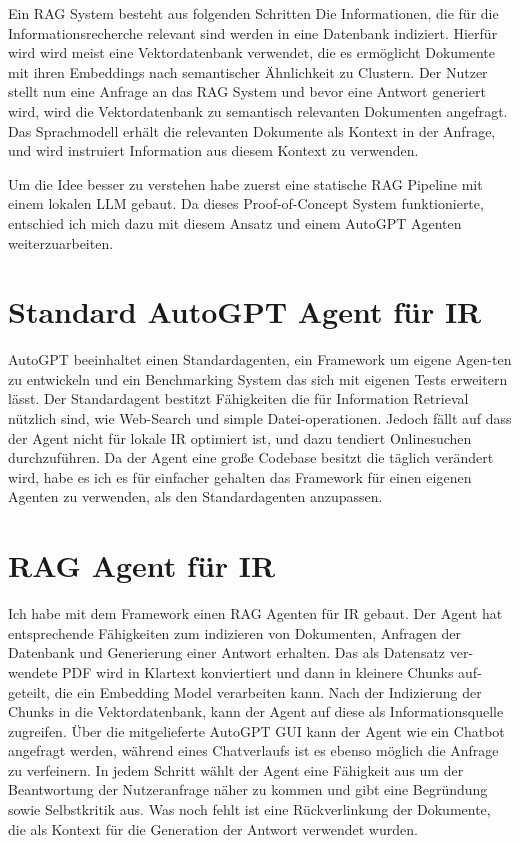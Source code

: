 \documentclass{report}
\begin{document}
Ein RAG System besteht aus folgenden Schritten
Die Informationen, die für die Informationsrecherche relevant sind werden in eine Datenbank indiziert.
Hierfür wird wird meist eine Vektordatenbank verwendet, die es ermöglicht Dokumente mit ihren Embeddings nach semantischer Ähnlichkeit zu Clustern.
Der Nutzer stellt nun eine Anfrage an das RAG System und bevor eine Antwort generiert wird, wird die Vektordatenbank zu semantisch relevanten Dokumenten angefragt.
Das Sprachmodell erhält die relevanten Dokumente als Kontext in der Anfrage, und wird instruiert Information aus diesem Kontext zu verwenden.

Um die Idee besser zu verstehen habe zuerst eine statische RAG Pipeline mit einem lokalen LLM gebaut.
Da dieses Proof-of-Concept System funktionierte, entschied ich mich dazu mit diesem Ansatz und einem AutoGPT Agenten weiterzuarbeiten.

\section*{Standard AutoGPT Agent für IR}

AutoGPT beeinhaltet einen Standardagenten, ein Framework um eigene Agen-ten zu entwickeln und ein Benchmarking System das sich mit eigenen Tests erweitern lässt.
Der Standardagent bestitzt Fähigkeiten die für Information Retrieval nützlich sind, wie Web-Search und simple Datei-operationen.
Jedoch fällt auf dass der Agent nicht für lokale IR optimiert ist, und dazu tendiert Onlinesuchen durchzuführen.
Da der Agent eine große Codebase besitzt die täglich verändert wird, habe es ich es für einfacher gehalten das Framework für einen eigenen Agenten zu verwenden, als den Standardagenten anzupassen.

\section*{RAG Agent für IR}

Ich habe mit dem Framework einen RAG Agenten für IR gebaut.
Der Agent hat entsprechende Fähigkeiten zum indizieren von Dokumenten, Anfragen der Datenbank und Generierung einer Antwort erhalten.
Das als Datensatz ver-wendete PDF wird in Klartext konviertiert und dann in kleinere Chunks auf-geteilt, die ein Embedding Model verarbeiten kann.
Nach der Indizierung der Chunks in die Vektordatenbank, kann der Agent auf diese als Informationsquelle zugreifen.
Über die mitgelieferte AutoGPT GUI kann der Agent wie ein Chatbot angefragt werden, während eines Chatverlaufs ist es ebenso möglich die Anfrage zu verfeinern.
In jedem Schritt wählt der Agent eine Fähigkeit aus um der Beantwortung der Nutzeranfrage näher zu kommen und gibt eine Begründung sowie Selbstkritik aus.
Was noch fehlt ist eine Rückverlinkung der Dokumente, die als Kontext für die Generation der Antwort verwendet wurden.
\end{document}
